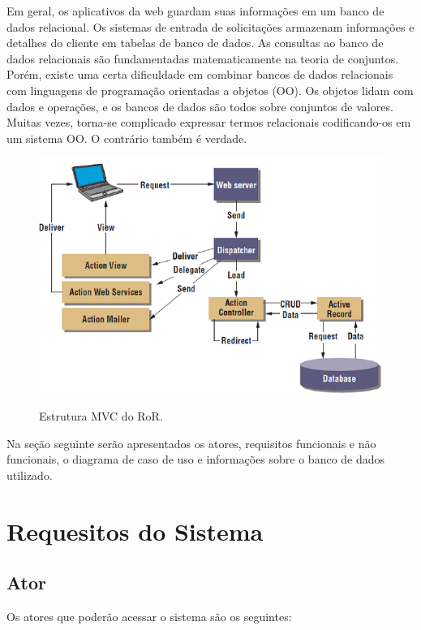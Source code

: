 Em geral, os aplicativos da web guardam suas informações em um banco de dados relacional. Os sistemas de entrada de solicitações armazenam informações e detalhes do cliente em tabelas de banco de dados. As consultas ao banco de dados relacionais são fundamentadas matematicamente na  teoria de conjuntos. Porém, existe uma certa dificuldade em combinar bancos de dados relacionais com linguagens de programação orientadas a objetos (OO).
Os objetos lidam com dados e operações, e os bancos de dados são todos sobre conjuntos de valores. Muitas vezes, torna-se complicado expressar termos relacionais  codificando-os em um sistema OO. O contrário também é verdade. 

\begin{figure}[h]
	\caption{Estrutura MVC do RoR.}
	
	\centering %
	\includegraphics{Figs/frameworkRuby.png} %
	\label{figura:frameworkRuby}
\end{figure}

Na seção seguinte serão apresentados os atores, requisitos funcionais e não funcionais, o diagrama de caso de uso e informações sobre o banco de dados utilizado.

\section{Requesitos do Sistema}
\subsection{Ator}
Os atores que poderão acessar o sistema são os seguintes:
 
